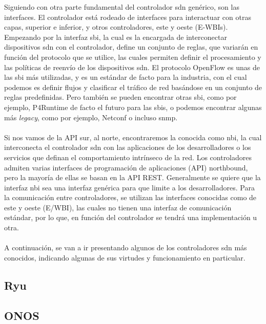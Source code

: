 Siguiendo con otra parte fundamental del controlador \gls{sdn} genérico, son las interfaces. El controlador está rodeado de interfaces para interactuar con otras capas, superior e inferior, y otros controladores, este y oeste (E-WBIs). Empezando por la interfaz \gls{sbi}, la cual es la encargada de interconectar dispositivos \gls{sdn} con el controlador, define un conjunto de reglas, que variarán en función del protocolo que se utilice, las cuales permiten definir el procesamiento y las políticas de reenvío de los dispositivos \gls{sdn}. El protocolo OpenFlow es unas de las \gls{sbi} más utilizadas, y es un estándar de facto para la industria, con el cual podemos es definir flujos y clasificar el tráfico de red basándose en un conjunto de reglas predefinidas. Pero también se pueden encontrar otras \gls{sbi}, como por ejemplo, P4Runtime de facto el futuro para las \gls{sbi}s, o podemos encontrar algunas más \textit{legacy}, como por ejemplo, Netconf o incluso \gls{snmp}.\\
\\
Si nos vamos de la API sur, al norte, encontraremos la conocida como \gls{nbi}, la cual interconecta el controlador \gls{sdn} con las aplicaciones de los desarrolladores o los servicios que definan el comportamiento intrínseco de la red. Los controladores admiten varias interfaces de programación de aplicaciones (API) northbound, pero la mayoría de ellas se basan en la API REST. Generalmente se quiere que la interfaz \gls{nbi} sea una interfaz genérica para que limite a los desarrolladores. Para la comunicación entre controladores, se utilizan las interfaces conocidas como de este y oeste (E/WBI), las cuales no tienen una interfaz de comunicación estándar, por lo que, en función del controlador se tendrá una implementación u otra.\\
\\
A continuación, se van a ir presentando algunos de los controladores \gls{sdn} más conocidos, indicando algunas de sus virtudes y funcionamiento en particular.

\subsection{Ryu}
\label{subsec:ryu}


\subsection{ONOS}
\label{subsec:ONOS}